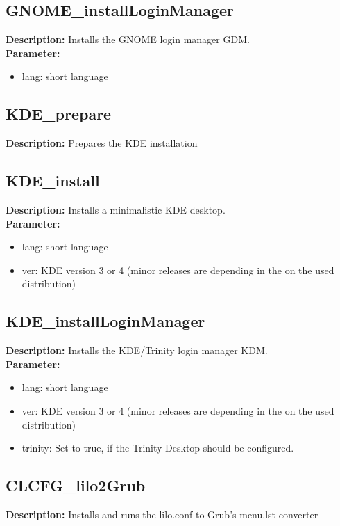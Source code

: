 \subsection{GNOME\_installLoginManager}
\textbf{Description:} Installs the GNOME login manager GDM.\\
\textbf{Parameter:}
\begin{itemize}
\item lang: short language
\end{itemize}

\subsection{KDE\_prepare}
\textbf{Description:} Prepares the KDE installation\\

\subsection{KDE\_install}
\textbf{Description:} Installs a minimalistic KDE desktop.\\
\textbf{Parameter:}
\begin{itemize}
\item lang: short language
\item ver: KDE version 3 or 4 (minor releases are depending in the on the used distribution)
\end{itemize}

\subsection{KDE\_installLoginManager}
\textbf{Description:} Installs the KDE/Trinity login manager KDM.\\
\textbf{Parameter:}
\begin{itemize}
\item lang: short language
\item ver: KDE version 3 or 4 (minor releases are depending in the on the used distribution)
\item trinity: Set to true, if the Trinity Desktop should be configured.
\end{itemize}

\subsection{CLCFG\_lilo2Grub}
\textbf{Description:} Installs and runs the lilo.conf to Grub's menu.lst converter\\

